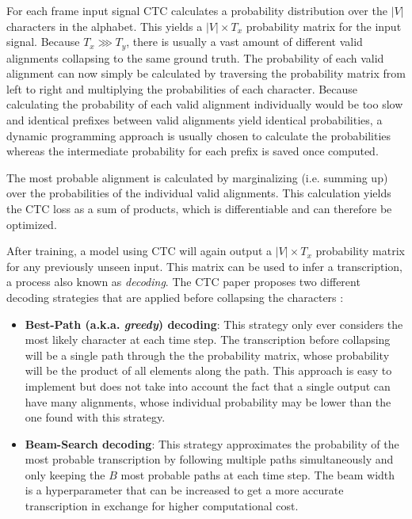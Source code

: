 For each frame input signal \ac{CTC} calculates a probability distribution over the $|V|$ characters in the alphabet. This yields a $|V| \times T_x$ probability matrix for the input signal. Because $T_x \ggg T_y$, there is usually a vast amount of different valid alignments collapsing to the same ground truth. The probability of each valid alignment can now simply be calculated by traversing the probability matrix from left to right and multiplying the probabilities of each character. Because calculating the probability of each valid alignment individually would be too slow and identical prefixes between valid alignments yield identical probabilities, a dynamic programming approach is usually chosen to calculate the probabilities whereas the intermediate probability for each prefix is saved once computed.

The most probable alignment is calculated by marginalizing (i.e. summing up) over the probabilities of the individual valid alignments. This calculation yields the CTC loss as a sum of products, which is differentiable and can therefore be optimized.

After training, a model using \ac{CTC} will again output a $|V| \times T_x$ probability matrix for any previously unseen input. This matrix can be used to infer a transcription, a process also known as \textit{decoding}. The \ac{CTC} paper proposes two different decoding strategies that are applied before collapsing the characters \cite{ctc_paper}:

\begin{itemize}
	\item \textbf{Best-Path (a.k.a. \textit{greedy}) decoding}: This strategy only ever considers the most likely character at each time step. The transcription before collapsing will be a single path through the the probability matrix, whose probability will be the product of all elements along the path. This approach is easy to implement but does not take into account the fact that a single output can have many alignments, whose individual probability may be lower than the one found with this strategy.
	\item \textbf{Beam-Search decoding}: This strategy approximates the probability of the most probable transcription by following multiple paths simultaneously and only keeping the $B$ most probable paths at each time step. The beam width is a hyperparameter that can be increased to get a more accurate transcription in exchange for higher computational cost.
\end{itemize}

